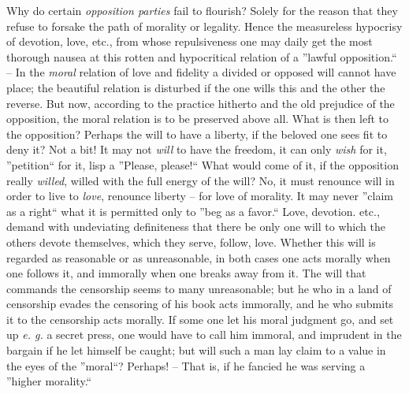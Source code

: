 \documentclass[12pt,a4paper]{book}
\begin{document}
Why do certain \textit{opposition parties} fail to flourish? Solely for the 
reason that they refuse to forsake the path of morality or legality. Hence the 
measureless hypocrisy of devotion, love, etc., from whose repulsiveness one 
may daily get the most thorough nausea at this rotten and hypocritical 
relation of a ''lawful opposition.`` -- In the \textit{moral} relation of 
love and fidelity a divided or opposed will cannot have place; the beautiful 
relation is disturbed if the one wills this and the other the reverse. But 
now, according to the practice hitherto and the old prejudice of the 
opposition, the moral relation is to be preserved above all. What is then left 
to the opposition? Perhaps the will to have a liberty, if the beloved one sees 
fit to deny it? Not a bit! It may not \textit{will} to have the freedom, it 
can only \textit{wish} for it, ''petition`` for it, lisp a ''Please, 
please!`` What would come of it, if the opposition really \textit{willed}, 
willed with the full energy of the will? No, it must renounce will in order to 
live to \textit{love}, renounce liberty -- for love of morality. It may never 
''claim as a right`` what it is permitted only to ''beg as a favor.`` 
Love, devotion. etc., demand with undeviating definiteness that there be only 
one will to which the others devote themselves, which they serve, follow, 
love. Whether this will is regarded as reasonable or as unreasonable, in both 
cases one acts morally when one follows it, and immorally when one breaks away 
from it. The will that commands the censorship seems to many unreasonable; but 
he who in a land of censorship evades the censoring of his book acts 
immorally, and he who submits it to the censorship acts morally. If some one 
let his moral judgment go, and set up \textit{e. g.} a secret press, one would 
have to call him immoral, and imprudent in the bargain if he let himself be 
caught; but will such a man lay claim to a value in the eyes of the 
''moral``? Perhaps! -- That is, if he fancied he was serving a ''higher 
morality.``
\end{document}
